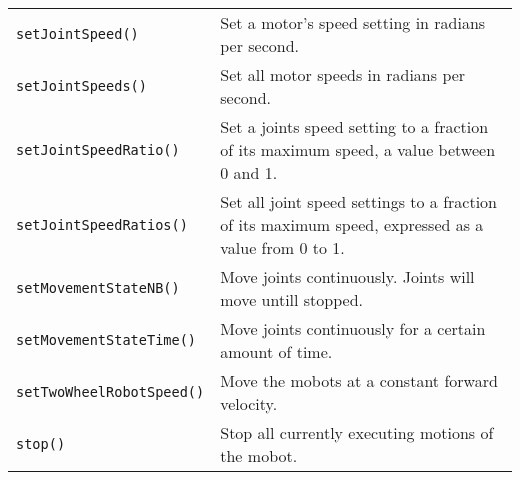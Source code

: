 \begin{tabular}{p{1.75in}p{4.5in}}
\texttt{setJointSpeed()} & Set a motor's speed setting in radians per second. \\
\texttt{setJointSpeeds()} & Set all motor speeds in radians per second. \\
\texttt{setJointSpeedRatio()} & Set a joints speed setting to a fraction of its maximum speed, a value between 0 and 1. \\
\texttt{setJointSpeedRatios()} & Set all joint speed settings to a fraction of its
maximum speed, expressed as a value from 0 to 1. \\
\texttt{setMovementStateNB()} & Move joints continuously. Joints will move untill stopped.\\
\texttt{setMovementStateTime()} & Move joints continuously for a certain amount of time.\\
\texttt{setTwoWheelRobotSpeed()} & Move the mobots at a constant forward velocity. \\
\texttt{stop()} & Stop all currently executing motions of the mobot. \\
\hline
\end{tabular}

